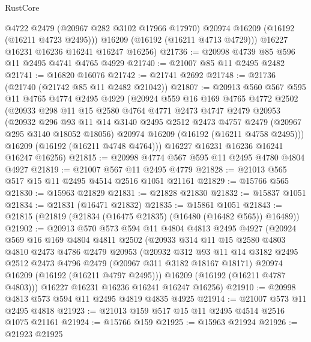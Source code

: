 \begin{lexlean}{RustCore}
\begin{coremodule}
          @4722
          @2479
          (@20967 @282 @3102 @17966 @17970)
          @20974
          @16209
          (@16192 (@16211 @4723 @2495)))
        @16209
        (@16192 (@16211 @4713 @4729)))
      @16227
      @16231
      @16236
      @16241
      @16247
      @16256)
@21736 := @20998 @4739 @85 @596 @11 @2495 @4741 @4765 @4929
@21740 := @21007 @85 @11 @2495 @2482
@21741 := @16820 @16076
@21742 := @21741 @2692
@21748 := @21736 (@21740 (@21742 @85 @11 @2482 @21042))
@21807 := @20913
    @560
    @567
    @595
    @11
    @4765
    @4774
    @2495
    @4929
    (@20924
      @559
      @16
      @169
      @4765
      @4772
      @2502
      (@20933
        @298
        @11
        @15
        @2580
        @4764
        @4771
        @2473
        @4747
        @2479
        @20953
        (@20932
          @296
          @93
          @11
          @14
          @3140
          @2495
          @2512
          @2473
          @4757
          @2479
          (@20967 @295 @3140 @18052 @18056)
          @20974
          @16209
          (@16192 (@16211 @4758 @2495)))
        @16209
        (@16192 (@16211 @4748 @4764)))
      @16227
      @16231
      @16236
      @16241
      @16247
      @16256)
@21815 := @20998 @4774 @567 @595 @11 @2495 @4780 @4804 @4927
@21819 := @21007 @567 @11 @2495 @4779
@21828 := @21013 @565 @517 @15 @11 @2495 @4514 @2516 @1051 @21161
@21829 := @15766 @565
@21830 := @15963 @21829
@21831 := @21828 @21830
@21832 := @15837 @1051
@21834 := @21831 (@16471 @21832)
@21835 := @15861 @1051
@21843 := @21815 (@21819 (@21834 (@16475 @21835) (@16480 (@16482 @565)) @16489))
@21902 := @20913
    @570
    @573
    @594
    @11
    @4804
    @4813
    @2495
    @4927
    (@20924
      @569
      @16
      @169
      @4804
      @4811
      @2502
      (@20933
        @314
        @11
        @15
        @2580
        @4803
        @4810
        @2473
        @4786
        @2479
        @20953
        (@20932
          @312
          @93
          @11
          @14
          @3182
          @2495
          @2512
          @2473
          @4796
          @2479
          (@20967 @311 @3182 @18167 @18171)
          @20974
          @16209
          (@16192 (@16211 @4797 @2495)))
        @16209
        (@16192 (@16211 @4787 @4803)))
      @16227
      @16231
      @16236
      @16241
      @16247
      @16256)
@21910 := @20998 @4813 @573 @594 @11 @2495 @4819 @4835 @4925
@21914 := @21007 @573 @11 @2495 @4818
@21923 := @21013 @159 @517 @15 @11 @2495 @4514 @2516 @1075 @21161
@21924 := @15766 @159
@21925 := @15963 @21924
@21926 := @21923 @21925

\end{coremodule}
\end{lexlean}
